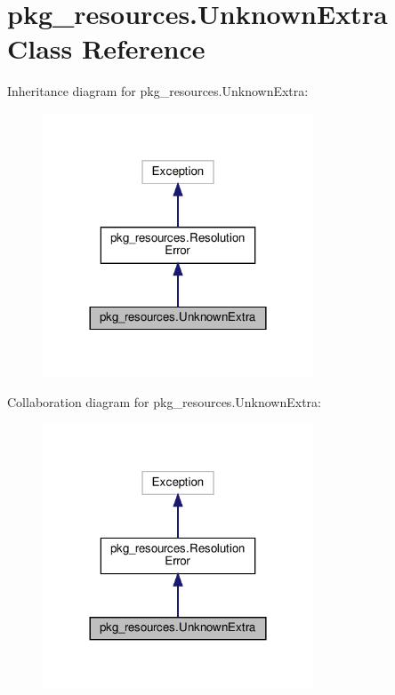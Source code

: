 \hypertarget{classpkg__resources_1_1UnknownExtra}{}\section{pkg\+\_\+resources.\+Unknown\+Extra Class Reference}
\label{classpkg__resources_1_1UnknownExtra}


Inheritance diagram for pkg\+\_\+resources.\+Unknown\+Extra\+:
\nopagebreak
\begin{figure}[H]
\begin{center}
\leavevmode
\includegraphics[width=228pt]{classpkg__resources_1_1UnknownExtra__inherit__graph}
\end{center}
\end{figure}


Collaboration diagram for pkg\+\_\+resources.\+Unknown\+Extra\+:
\nopagebreak
\begin{figure}[H]
\begin{center}
\leavevmode
\includegraphics[width=228pt]{classpkg__resources_1_1UnknownExtra__coll__graph}
\end{center}
\end{figure}
